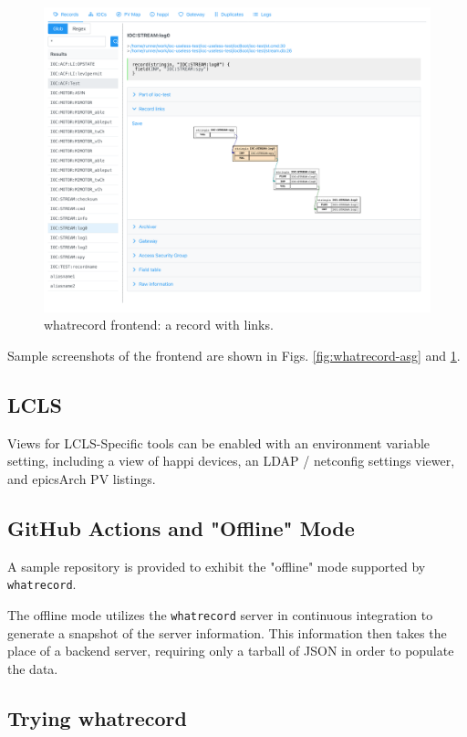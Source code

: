 \documentclass[letter,
               keeplastbox,   %
               ]{jacow}
\begin{document}
\begin{figure}
   \centering
   \includegraphics*[width=.9\columnwidth]{whatrecord-ioc-stream-log0}
   \caption{whatrecord frontend: a record with links.}
   \label{fig:whatrecord-links}
\end{figure}

Sample screenshots of the frontend are shown in Figs. \ref{fig:whatrecord-asg}
and \ref{fig:whatrecord-links}.

\subsection{LCLS}
Views for LCLS-Specific tools can be enabled with an environment variable
setting, including a view of happi devices, an LDAP / netconfig settings
viewer, and epicsArch PV listings.

\subsection{GitHub Actions and "Offline" Mode}

A sample repository\cite{gha-sample} is provided to exhibit the "offline" mode
supported by \verb_whatrecord_.

The offline mode utilizes the \verb_whatrecord_ server in continuous
integration to generate a snapshot of the server information. This information
then takes the place of a backend server, requiring only a tarball of JSON in
order to populate the data.

\subsection{Trying whatrecord}
\end{document}
